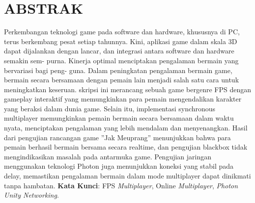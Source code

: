 \chapter*{ABSTRAK}
\noindent
Perkembangan teknologi game pada software dan hardware, khususnya di PC, terus
berkembang pesat setiap tahunnya. Kini, aplikasi game dalam skala 3D dapat
dijalankan dengan lancar, dan integrasi antara software dan hardware semakin sem-
purna. Kinerja optimal menciptakan pengalaman bermain yang bervariasi bagi peng-
guna. Dalam peningkatan pengalaman bermain game, bermain secara bersamaan
dengan pemain lain menjadi salah satu cara untuk meningkatkan keseruan. skripsi ini merancang sebuah game bergenre FPS dengan gameplay interaktif yang memungkinkan para pemain mengendalikan karakter yang beraksi dalam dunia game. Selain itu, implementasi synchronous multiplayer memungkinkan pemain bermain secara bersamaan dalam waktu nyata, menciptakan pengalaman yang lebih mendalam dan menyenangkan.
Hasil dari pengujian rancangan game ”Jak Meuprang” menunjukkan bahwa para
pemain berhasil bermain bersama secara realtime, dan pengujian blackbox tidak
mengindikasikan masalah pada antarmuka game. Pengujian jaringan menggunakan
teknologi Photon juga menunjukkan koneksi yang stabil pada delay, memastikan pengalaman
bermain dalam mode multiplayer dapat dinikmati tanpa hambatan.
\newline
\noindent \textbf{Kata Kunci}: FPS \textit{Multiplayer}, Online \textit{Multiplayer}, \textit{Photon Unity Networking}.